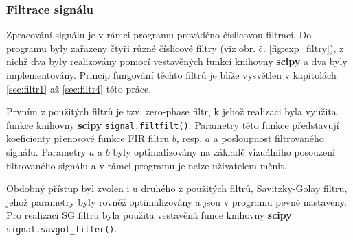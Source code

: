 \documentclass[a4paper, 12pt]{article}
\begin{document}
\subsubsection{Filtrace signálu}\label{sec:exp_filtrace}
Zpracování signálu je v rámci programu prováděno číslicovou filtrací. Do programu byly zařazeny čtyři různé číslicové filtry (viz obr. č. \ref{fig:exp_filtry}), z nichž dva byly realizovány pomocí vestavěných funkcí knihovny \textbf{scipy} a dva byly implementovány. Princip fungování těchto filtrů je blíže vysvětlen v kapitolách \ref{sec:filtr1} až \ref{sec:filtr4} této práce.

Prvním z použitých filtrů je tzv. zero-phase filtr, k jehož realizaci byla využita funkce knihovny \textbf{scipy} \texttt{signal.filtfilt()}. Parametry této funkce představují koeficienty přenosové funkce FIR filtru $b$, resp. $a$ a posloupnost filtrovaného signálu. Parametry $a$ a $b$ byly optimalizovány na základě vizuálního posouzení filtrovaného signálu a v rámci programu je nelze uživatelem měnit.

Obdobný přístup byl zvolen i u druhého z použitých filtrů, Savitzky-Golay filtru, jehož parametry byly rovněž optimalizovány a jsou v programu pevně nastaveny. Pro realizaci SG filtru byla použita vestavěná funce knihovny \textbf{scipy} \texttt{signal.savgol}\verb|_|\texttt{filter()}.
\end{document}
